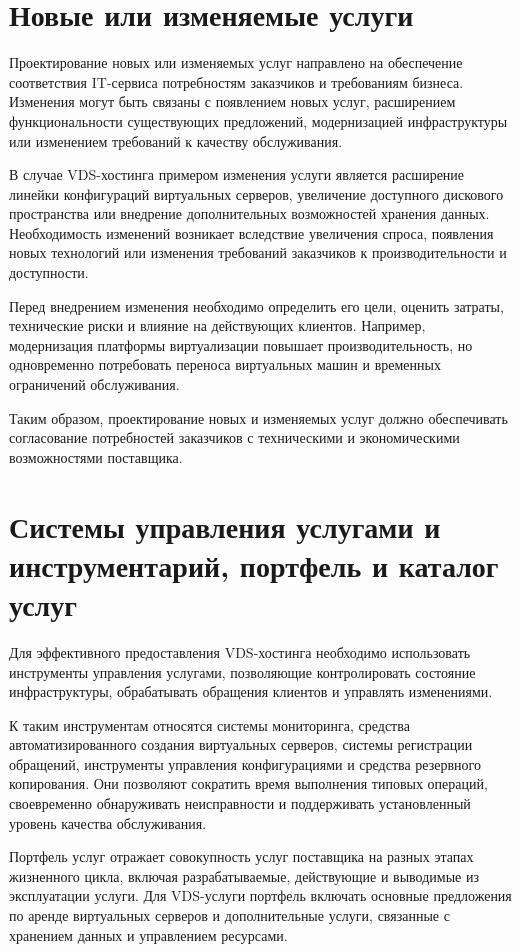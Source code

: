 \documentclass[14pt,a4paper]{extarticle}
\begin{document}
\section{Новые или изменяемые услуги}

Проектирование новых или изменяемых услуг направлено на обеспечение соответствия IT-сервиса потребностям заказчиков и требованиям бизнеса. Изменения могут быть связаны с появлением новых услуг, расширением функциональности существующих предложений, модернизацией инфраструктуры или изменением требований к качеству обслуживания.

В случае VDS-хостинга примером изменения услуги является расширение линейки конфигураций виртуальных серверов, увеличение доступного дискового пространства или внедрение дополнительных возможностей хранения данных. Необходимость изменений возникает вследствие увеличения спроса, появления новых технологий или изменения требований заказчиков к производительности и доступности.

Перед внедрением изменения необходимо определить его цели, оценить затраты, технические риски и влияние на действующих клиентов. Например, модернизация платформы виртуализации повышает производительность, но одновременно потребовать переноса виртуальных машин и временных ограничений обслуживания.

Таким образом, проектирование новых и изменяемых услуг должно обеспечивать согласование потребностей заказчиков с техническими и экономическими возможностями поставщика.

\section{Системы управления услугами и инструментарий, портфель и каталог услуг}

Для эффективного предоставления VDS-хостинга необходимо использовать инструменты управления услугами, позволяющие контролировать состояние инфраструктуры, обрабатывать обращения клиентов и управлять изменениями.

К таким инструментам относятся системы мониторинга, средства автоматизированного создания виртуальных серверов, системы регистрации обращений, инструменты управления конфигурациями и средства резервного копирования. Они позволяют сократить время выполнения типовых операций, своевременно обнаруживать неисправности и поддерживать установленный уровень качества обслуживания.

Портфель услуг отражает совокупность услуг поставщика на разных этапах жизненного цикла, включая разрабатываемые, действующие и выводимые из эксплуатации услуги. Для VDS-услуги портфель включать основные предложения по аренде виртуальных серверов и дополнительные услуги, связанные с хранением данных и управлением ресурсами.
\end{document}
